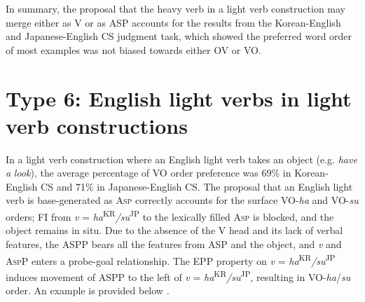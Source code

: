 In summary, the proposal that the heavy verb in a light verb construction may merge either as V or as \ac{ASP} accounts for the results from the Korean-English and Japanese-English \ac{CS} judgment task, which showed the preferred word order of most examples was not biased towards either \ac{OV} or \ac{VO}.

\section{Type 6: English light verbs in light verb constructions}\label{ch5:sect:5.6}

In a light verb construction where an English light verb takes an object (e.g. \textit{have} \textit{a} \textit{look}), the average percentage of \ac{VO} order preference was 69\% in Korean-English \ac{CS} and 71\% in Japanese-English \ac{CS}. The proposal that an English light verb is base-generated as \textsc{Asp} correctly accounts for the surface \ac{VO}-\textit{ha} and \ac{VO}-\textit{su} orders; \ac{FI} from \textit{v} = \textit{ha}\textsuperscript{KR}\textit{/su}\textsuperscript{JP} to the lexically filled \textsc{Asp} is blocked, and the object remains in situ. Due to the absence of the V head and its lack of verbal features, the \ac{ASP}P bears all the features from \ac{ASP} and the object, and \textit{v} and A\textsc{spP} enters a probe-goal relationship. The \ac{EPP} property on \textit{v} = \textit{ha}\textsuperscript{KR}\textit{/su}\textsuperscript{JP} induces movement of \ac{ASP}P to the left of \textit{v} = \textit{ha}\textsuperscript{KR}\textit{/su}\textsuperscript{JP}, resulting in \ac{VO}-\textit{ha}/\textit{su} order. An example is provided below .

\ea\label{ex:128}
    \ea {}
    \ex{}
    \z
\z

